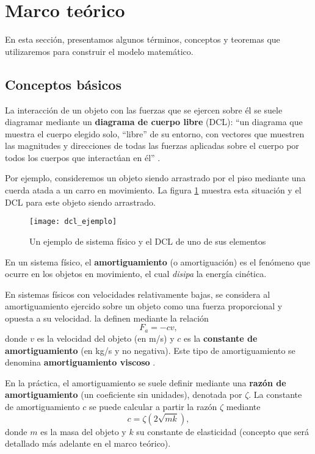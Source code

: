 \section{Marco teórico}

En esta sección, presentamos algunos términos, conceptos y teoremas que utilizaremos para construir el modelo matemático.

\subsection{Conceptos básicos}

La interacción de un objeto con las fuerzas que se ejercen sobre él se suele diagramar mediante un \textbf{diagrama de cuerpo libre} (DCL): ``un diagrama que muestra el cuerpo elegido solo, ``libre'' de su entorno, con vectores que muestren las magnitudes y direcciones de todas las fuerzas aplicadas sobre el cuerpo por todos los cuerpos que interactúan en él'' \citep{young}.

Por ejemplo, consideremos un objeto siendo arrastrado por el piso mediante una cuerda atada a un carro en movimiento. La figura \ref{fig:dcl-ejemplo} muestra esta situación y el DCL para este objeto siendo arrastrado.

\begin{figure}[ht!]
    \centering
    \texttt{[image: dcl\_ejemplo]}
    \caption{Un ejemplo de sistema físico y el DCL de uno de sus elementos}
    \label{fig:dcl-ejemplo}
\end{figure}

\begin{definition}[amortiguamiento]
    En un sistema físico, el \textbf{amortiguamiento} (o amortiguación) es el fenómeno que ocurre en los objetos en movimiento, el cual \textit{disipa} la energía cinética.
\end{definition}

En sistemas físicos con velocidades relativamente bajas, se considera al amortiguamiento ejercido sobre un objeto como una fuerza proporcional y opuesta a su velocidad. \citet{rak} la definen mediante la relación
\[
    F_a = -cv
,\]
donde \(v\) es la velocidad del objeto (en \si{m/s}) y \(c\) es la \textbf{constante de amortiguamiento} (en \si{kg/s} y no negativa). Este tipo de amortiguamiento se denomina \textbf{amortiguamiento viscoso} \citep{rak}.

En la práctica, el amortiguamiento se suele definir mediante una \textbf{razón de amortiguamiento} (un coeficiente sin unidades), denotada por \(\zeta\). La constante de amortiguamiento \(c\) se puede calcular a partir la razón \(\zeta\) mediante
\[
    c = \zeta \left( 2\sqrt{mk} \right)
,\]
donde \(m\) es la masa del objeto y \(k\) su constante de elasticidad (concepto que será detallado más adelante en el marco teórico).

